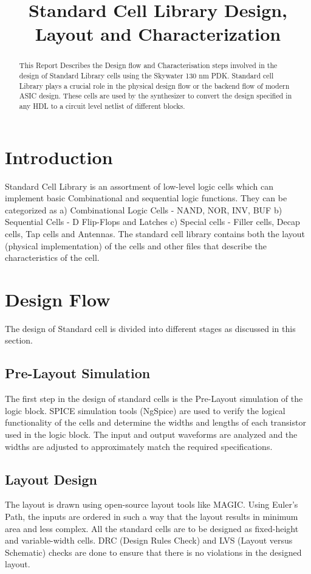\documentclass[conference]{IEEEtran}
\begin{document}
\title{ Standard Cell Library Design, Layout and Characterization}

\author{
}

\maketitle

\begin{abstract} This Report Describes the Design flow and Characterisation steps involved in the design of Standard Library cells using the Skywater 130 nm PDK. Standard cell Library plays a crucial role in the physical design flow or the backend flow of modern ASIC design. These cells are used by the synthesizer to convert the design specified in any HDL to a circuit level netlist of different blocks.  
\end{abstract}

\section{Introduction}
Standard Cell Library is an assortment of low-level logic cells which can implement basic Combinational and sequential logic functions. They can be categorized as a) Combinational Logic Cells - NAND, NOR, INV, BUF b) Sequential Cells - D Flip-Flops and Latches c) Special cells - Filler cells, Decap cells, Tap cells and Antennas. The standard cell library contains both the layout (physical implementation) of the cells and other files that describe the characteristics of the cell. 
\section{Design Flow}
The design of Standard cell is divided into different stages as discussed in this section.
\subsection{Pre-Layout Simulation}
The first step in the design of standard cells is the Pre-Layout simulation of the logic block. SPICE simulation tools (NgSpice) are used to verify the logical functionality of the cells and determine the widths and lengths of each transistor used in the logic block. The input and output waveforms are analyzed and the widths are adjusted to approximately match the required specifications. 
\subsection{Layout Design}
The layout is drawn using open-source layout tools like MAGIC. Using Euler's Path, the inputs are ordered in such a way that the layout results in minimum area and less complex. All the standard cells are to be designed as fixed-height and variable-width cells. DRC (Design Rules Check) and LVS (Layout versus Schematic) checks are done to ensure that there is no violations in the designed layout.
\end{document}
